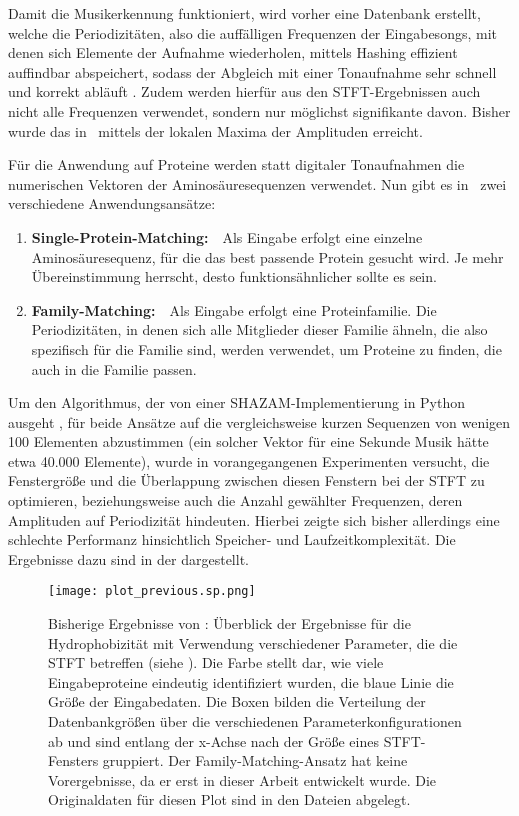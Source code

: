     Damit die Musikerkennung funktioniert, wird vorher eine Datenbank erstellt, welche die Periodizitäten, also die auffälligen Frequenzen der Eingabesongs, mit denen sich Elemente der Aufnahme wiederholen, mittels Hashing effizient auffindbar abspeichert, sodass der Abgleich mit einer Tonaufnahme sehr schnell und korrekt abläuft . Zudem werden hierfür aus den \ac{STFT}-Ergebnissen auch nicht alle Frequenzen verwendet, sondern nur möglichst signifikante davon. Bisher wurde das in \protfin\ mittels der lokalen Maxima der Amplituden erreicht.

    Für die Anwendung auf Proteine werden statt digitaler Tonaufnahmen die numerischen Vektoren der Aminosäuresequenzen verwendet. Nun gibt es in \protfin\ zwei verschiedene Anwendungsansätze:
    \begin{enumerate}
        \item \textbf{Single-Protein-Matching:}\ \ Als Eingabe erfolgt eine einzelne Aminosäuresequenz, für die das best passende Protein gesucht wird. Je mehr Übereinstimmung herrscht, desto funktionsähnlicher sollte es sein.
        \item \textbf{Family-Matching:}\ \ Als Eingabe erfolgt eine Proteinfamilie. Die Periodizitäten, in denen sich alle Mitglieder dieser Familie ähneln, die also spezifisch für die Familie sind, werden verwendet, um Proteine zu finden, die auch in die Familie passen.
    \end{enumerate}
    \label{kurze_sequenzen}

    Um den Algorithmus, der von einer SHAZAM-Implementierung in Python ausgeht \autocite{blog}, für beide Ansätze auf die vergleichsweise kurzen Sequenzen von wenigen 100 Elementen abzustimmen (ein solcher Vektor für eine Sekunde Musik hätte etwa 40.000 Elemente), wurde in vorangegangenen Experimenten versucht, die Fenstergröße und die Überlappung zwischen diesen Fenstern bei der \ac{STFT} zu optimieren, beziehungsweise auch die Anzahl gewählter Frequenzen, deren Amplituden auf Periodizität hindeuten. Hierbei zeigte sich bisher allerdings eine schlechte Performanz hinsichtlich Speicher- und Laufzeitkomplexität. Die Ergebnisse dazu sind in der  dargestellt.

    \begin{figure}[H]
        \texttt{[image: plot\_previous.sp.png]}
        \caption[Bisherige Ergebnisse von \protfin]{Bisherige Ergebnisse von \protfin: Überblick der Ergebnisse für die Hydrophobizität mit Verwendung verschiedener Parameter, die die \acs{STFT} betreffen (siehe ). Die Farbe stellt dar, wie viele Eingabeproteine eindeutig identifiziert wurden, die blaue Linie die Größe der Eingabedaten. Die Boxen bilden die Verteilung der Datenbankgrößen über die verschiedenen Parameterkonfigurationen ab und sind entlang der x-Achse nach der Größe eines \ac{STFT}-Fensters gruppiert. Der Family-Matching-Ansatz hat keine Vorergebnisse, da er erst in dieser Arbeit entwickelt wurde. Die Originaldaten für diesen Plot sind in den Dateien  abgelegt.}
        \label{fig:prev_results}
    \end{figure}

